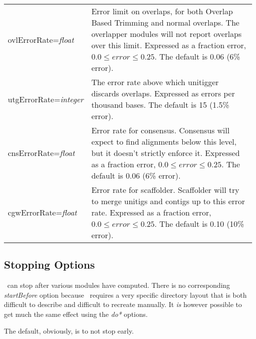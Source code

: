 \documentclass[twoside,11pt]{article}
\begin{document}
\begin{longtable}{lp{3.0in}}

ovlErrorRate={\it float} &
Error limit on overlaps, for both Overlap Based Trimming and normal
overlaps.  The overlapper modules will not report overlaps over this
limit.
Expressed as a fraction error, $0.0 \le error \le 0.25$.
The default is 0.06 (6\% error).
\\

utgErrorRate={\it integer} &
The error rate above which unitigger discards overlaps.
Expressed as errors per thousand bases.
The default is 15 (1.5\% error).
\\

cnsErrorRate={\it float} &
Error rate for consensus.  Consensus will expect to find alignments
below this level, but it doesn't strictly enforce it.
Expressed as a fraction error, $0.0 \le error \le 0.25$.
The default is 0.06 (6\% error).
\\

cgwErrorRate={\it float} &
Error rate for scaffolder.  Scaffolder will try to merge unitigs and
contigs up to this error rate.
Expressed as a fraction error, $0.0 \le error \le 0.25$.
The default is 0.10 (10\% error).
\\

\end{longtable}


\subsection{Stopping Options}
\label{sec:stopopts}

\runCA\ can stop after various modules have computed.  There is no
corresponding {\it startBefore} option because \runCA\ requires a very
specific directory layout that is both difficult to describe and
difficult to recreate manually.  It {\em is} however possible to get
much the same effect using the {\it do*} options.

The default, obviously, is to not stop early.
\end{document}
